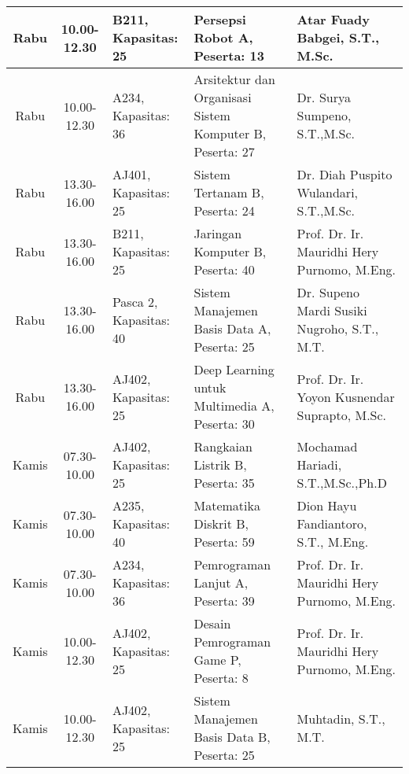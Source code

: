 \begin{longtable}[c]{|c|c|>{\centering\arraybackslash}m{2.5cm}|>{\centering\arraybackslash}m{4cm}|>{\centering\arraybackslash}m{3.2cm}|}
    Rabu   & 10.00-12.30 & B211, Kapasitas: 25    & Persepsi Robot A, \linebreak Peserta: 13                            & Atar Fuady Babgei, S.T., M.Sc.                \\ \hline
    Rabu   & 10.00-12.30 & A234, Kapasitas: 36    & Arsitektur dan Organisasi Sistem Komputer B, \linebreak Peserta: 27 & Dr. Surya Sumpeno, S.T.,M.Sc.                 \\ \hline
    Rabu   & 13.30-16.00 & AJ401, Kapasitas: 25   & Sistem Tertanam B, \linebreak Peserta: 24                           & Dr. Diah Puspito Wulandari, S.T.,M.Sc.        \\ \hline
    Rabu   & 13.30-16.00 & B211, Kapasitas: 25    & Jaringan Komputer B, \linebreak Peserta: 40                         & Prof. Dr. Ir. Mauridhi Hery Purnomo, M.Eng.   \\ \hline
    Rabu   & 13.30-16.00 & Pasca 2, Kapasitas: 40 & Sistem Manajemen Basis Data A, \linebreak Peserta: 25               & Dr. Supeno Mardi Susiki Nugroho, S.T., M.T.   \\ \hline
    Rabu   & 13.30-16.00 & AJ402, Kapasitas: 25   & Deep Learning untuk Multimedia A, \linebreak Peserta: 30            & Prof. Dr. Ir. Yoyon Kusnendar Suprapto, M.Sc. \\ \hline
    Kamis  & 07.30-10.00 & AJ402, Kapasitas: 25   & Rangkaian Listrik B, \linebreak Peserta: 35                         & Mochamad Hariadi, S.T.,M.Sc.,Ph.D             \\ \hline
    Kamis  & 07.30-10.00 & A235, Kapasitas: 40    & Matematika Diskrit B, \linebreak Peserta: 59                        & Dion Hayu Fandiantoro, S.T., M.Eng.           \\ \hline
    Kamis  & 07.30-10.00 & A234, Kapasitas: 36    & Pemrograman Lanjut A, \linebreak Peserta: 39                        & Prof. Dr. Ir. Mauridhi Hery Purnomo, M.Eng.   \\ \hline
    Kamis  & 10.00-12.30 & AJ402, Kapasitas: 25   & Desain Pemrograman Game P, \linebreak Peserta: 8                    & Prof. Dr. Ir. Mauridhi Hery Purnomo, M.Eng.   \\ \hline
    Kamis  & 10.00-12.30 & AJ402, Kapasitas: 25   & Sistem Manajemen Basis Data B, \linebreak Peserta: 25               & Muhtadin, S.T., M.T.                          \\ \hline

\end{longtable}
